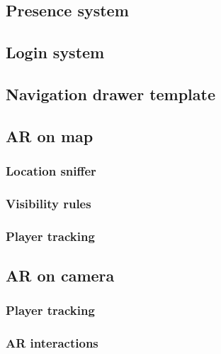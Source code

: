 		\subsection{Presence system}\label{focus:presence}
		
			
		
		\subsection{Login system}\label{focus:splash}
		
		\subsection{Navigation drawer template}\label{focus:drawer}
		
		\subsection{AR on map}\label{focus:map}
		
			\subsubsection{Location sniffer}
			
			\subsubsection{Visibility rules}
			
			\subsubsection{Player tracking}
		
		\subsection{AR on camera}
			
			\subsubsection{Player tracking}
			
			\subsubsection{AR interactions}